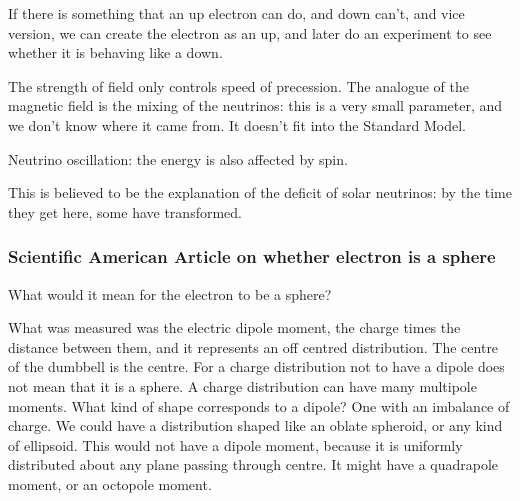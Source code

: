 \documentclass[]{article}
\begin{document}
If there is something that an up electron can do, and down can't, and vice version, we can create the electron as an up, and later do an experiment to see whether it is behaving like a down.

The strength of field only controls speed of precession. The analogue of the magnetic field is the mixing of the neutrinos: this is a very small parameter, and we don't know where it came from. It doesn't fit into the Standard Model.

Neutrino oscillation: the energy is also affected by spin.

This is believed to be the explanation of the deficit of solar neutrinos: by the time they get here, some have transformed.

\subsubsection{Scientific American Article on whether electron is a sphere}

What would it mean for the electron to be a sphere?\cite{Cartlidge2011Electron}

What was measured was the electric dipole moment, the charge times the distance between them, and it represents an off centred distribution. The centre of the dumbbell is the centre. For a charge distribution not to have a dipole does not mean that it is a sphere. A charge distribution can have many multipole moments. What kind of shape corresponds to a dipole? One with an imbalance of charge. We could have a distribution shaped like an oblate spheroid, or any kind of ellipsoid. This would not have a dipole moment, because it is uniformly distributed about any plane passing through centre. It might have a quadrapole moment, or an octopole moment.
\end{document}
